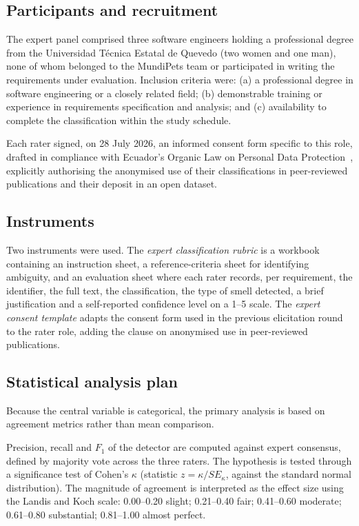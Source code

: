 \documentclass[pdflatex,sn-mathphys-num]{sn-jnl}
\theoremstyle{thmstyleone}%
\theoremstyle{thmstyletwo}%
\theoremstyle{thmstylethree}%
\begin{document}
	\subsection{Participants and recruitment}\label{subsec:participants}
	
	The expert panel comprised three software engineers holding a professional
	degree from the Universidad Técnica Estatal de Quevedo (two women and one man),
	none of whom belonged to the MundiPets team or participated in writing the
	requirements under evaluation. Inclusion criteria were: (a) a professional
	degree in software engineering or a closely related field; (b) demonstrable
	training or experience in requirements specification and analysis; and (c)
	availability to complete the classification within the study schedule.
	
	Each rater signed, on 28 July 2026, an informed consent form specific to this
	role, drafted in compliance with Ecuador's Organic Law on Personal Data
	Protection~\cite{lopdp2021}, explicitly authorising the anonymised use of their
	classifications in peer-reviewed publications and their deposit in an open
	dataset.
	
	\subsection{Instruments}\label{subsec:instruments}
	
	Two instruments were used. The \emph{expert classification rubric} is a workbook
	containing an instruction sheet, a reference-criteria sheet for identifying
	ambiguity, and an evaluation sheet where each rater records, per requirement,
	the identifier, the full text, the classification, the type of smell detected, a
	brief justification and a self-reported confidence level on a 1--5 scale. The
	\emph{expert consent template} adapts the consent form used in the previous
	elicitation round to the rater role, adding the clause on anonymised use in
	peer-reviewed publications.
	
	\subsection{Statistical analysis plan}\label{subsec:analysis}
	
	Because the central variable is categorical, the primary analysis is based on
	agreement metrics rather than mean comparison.
	
	Precision, recall and $F_1$ of the detector are computed against expert
	consensus, defined by majority vote across the three raters. The hypothesis is
	tested through a significance test of Cohen's $\kappa$ (statistic
	$z = \kappa / SE_\kappa$, against the standard normal distribution). The
	magnitude of agreement is interpreted as the effect size using the Landis and
	Koch scale: 0.00--0.20 slight; 0.21--0.40 fair; 0.41--0.60 moderate; 0.61--0.80
	substantial; 0.81--1.00 almost perfect.
	
\end{document}
